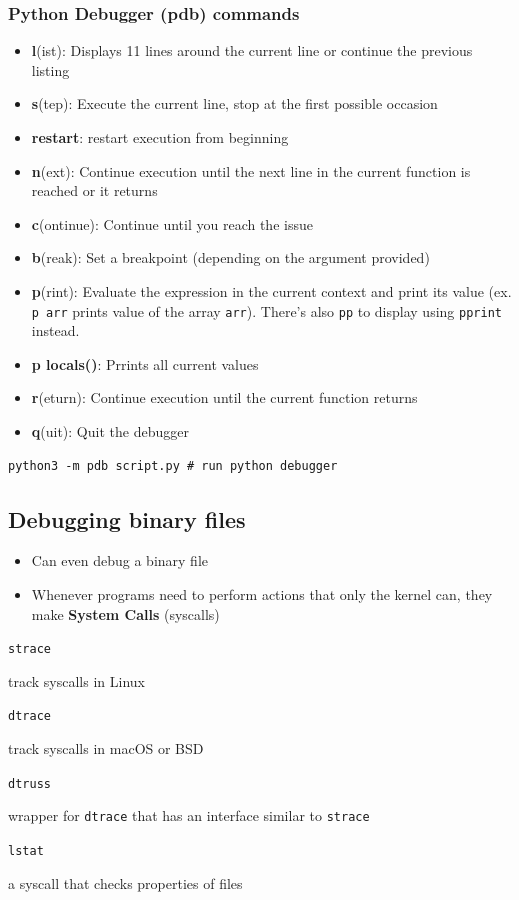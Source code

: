 \documentclass[letterpaper,12pt]{article}
\newcommand*{\lstitem}[1]{
  \setbox0\hbox{\lstinline{#1}}
  \item[\usebox0]
}
\begin{document}
\subsubsection{Python Debugger (pdb) commands}
\begin{itemize}
 \item \textbf{l}(ist): Displays 11 lines around the current line or continue the previous listing
 \item \textbf{s}(tep): Execute the current line, stop at the first possible occasion
 \item \textbf{restart}: restart execution from beginning
 \item \textbf{n}(ext): Continue execution until the next line in the current function is reached or it returns
 \item \textbf{c}(ontinue): Continue until you reach the issue
 \item \textbf{b}(reak): Set a breakpoint (depending on the argument provided)
 \item \textbf{p}(rint): Evaluate the expression in the current context and print its value (ex. \lstinline{p arr} prints value of the array \lstinline{arr}). There’s also \lstinline{pp} to display using \lstinline{pprint} instead.
 \item \textbf{p locals()}: Prrints all current values
 \item \textbf{r}(eturn): Continue execution until the current function returns
 \item \textbf{q}(uit): Quit the debugger
\end{itemize}

\begin{lstlisting}
python3 -m pdb script.py # run python debugger
\end{lstlisting}

\subsection{Debugging binary files}

\begin{itemize}
 \item Can even debug a binary file
 \item Whenever programs need to perform actions that only the kernel can, they make \textbf{System Calls} (syscalls)
\end{itemize}

\begin{description}
 \lstitem{strace} track syscalls in Linux
 \lstitem{dtrace} track syscalls in macOS or BSD
 \lstitem{dtruss} wrapper for \lstinline{dtrace} that has an interface similar to \lstinline{strace}
 \lstitem{lstat} a syscall that checks properties of files
\end{description}
\end{document}
